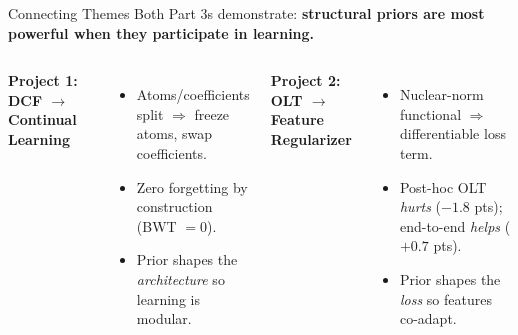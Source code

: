 \documentclass[10pt,aspectratio=169]{beamer}
\begin{document}
\begin{frame}{Connecting Themes}
Both Part 3s demonstrate: \textbf{structural priors are most powerful
when they participate in learning.}

\bigskip
\begin{columns}[T]
\textbf{Project 1: DCF $\to$ Continual Learning}
\begin{itemize}
\item Atoms/coefficients split $\Rightarrow$ freeze atoms, swap coefficients.
\item Zero forgetting by construction (BWT $= 0$).
\item Prior shapes the \emph{architecture} so learning is modular.
\end{itemize}

\textbf{Project 2: OLT $\to$ Feature Regularizer}
\begin{itemize}
\item Nuclear-norm functional $\Rightarrow$ differentiable loss term.
\item Post-hoc OLT \emph{hurts} ($-1.8$ pts); end-to-end \emph{helps} ($+0.7$ pts).
\item Prior shapes the \emph{loss} so features co-adapt.
\end{itemize}
\end{columns}

\bigskip
\centering
{}
\end{frame}
\end{document}

